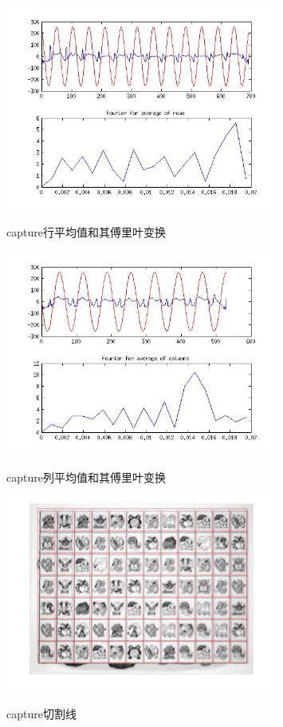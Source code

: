 \documentclass{ctexart}
\begin{document}
\begin{figure}
    \centering
    \includegraphics[width=0.8\textwidth]{process/a422b.jpg}\\
    \caption{capture行平均值和其傅里叶变换\label{a422b}}
\end{figure}
\begin{figure}
    \centering
    \includegraphics[width=0.8\textwidth]{process/a422c.jpg}\\
    \caption{capture列平均值和其傅里叶变换\label{a422c}}
\end{figure}
\begin{figure}
    \centering
    \includegraphics[width=0.8\textwidth]{process/a422d.jpg}\\
    \caption{capture切割线\label{a422d}}
\end{figure}
\end{document}
